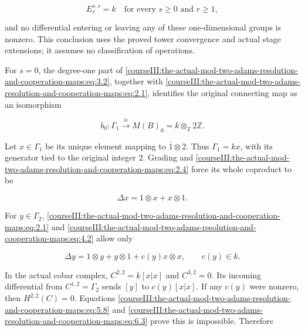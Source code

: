 \begin{equation}
E_r^{s,s}=k\quad\text{for every }s\geq0\text{ and }r\geq1,
 \label{courseIII:the-actual-mod-two-adams-resolution-and-cooperation-maps:eq:6.3}
\end{equation}

and no differential entering or leaving any of these one-dimensional groups is nonzero. This conclusion uses the proved tower convergence and actual stage extensions; it assumes no classification of operations.

For \(s=0\), the degree-one part of \eqref{courseIII:the-actual-mod-two-adams-resolution-and-cooperation-maps:eq:3.2}, together with \eqref{courseIII:the-actual-mod-two-adams-resolution-and-cooperation-maps:eq:2.1}, identifies the original connecting map as an isomorphism

\begin{equation}
b_0:\Gamma_1\xrightarrow{\ \cong\ }M(B)_0
    =k\otimes_{\mathbb Z}2\mathbb Z.
 \label{courseIII:the-actual-mod-two-adams-resolution-and-cooperation-maps:eq:6.4}
\end{equation}

Let \(x\in\Gamma_1\) be its unique element mapping to \(\bar1\otimes2\). Thus \(\Gamma_1=kx\), with its generator tied to the original integer \(2\). Grading and \eqref{courseIII:the-actual-mod-two-adams-resolution-and-cooperation-maps:eq:2.4} force its whole coproduct to be

\begin{equation}
\Delta x=1\otimes x+x\otimes1.
 \label{courseIII:the-actual-mod-two-adams-resolution-and-cooperation-maps:eq:6.5}
\end{equation}

For \(y\in\Gamma_2\), \eqref{courseIII:the-actual-mod-two-adams-resolution-and-cooperation-maps:eq:2.1} and \eqref{courseIII:the-actual-mod-two-adams-resolution-and-cooperation-maps:eq:4.2} allow only

\begin{equation}
\Delta y=1\otimes y+y\otimes1+c(y)x\otimes x,
 \qquad c(y)\in k.
 \label{courseIII:the-actual-mod-two-adams-resolution-and-cooperation-maps:eq:6.6}
\end{equation}

In the actual cobar complex, \(C^{2,2}=k[x|x]\) and \(C^{3,2}=0\). Its incoming differential from \(C^{1,2}=\Gamma_2\) sends \([y]\) to \(c(y)[x|x]\). If any \(c(y)\) were nonzero, then \(H^{2,2}(C)=0\). Equations \eqref{courseIII:the-actual-mod-two-adams-resolution-and-cooperation-maps:eq:5.8} and \eqref{courseIII:the-actual-mod-two-adams-resolution-and-cooperation-maps:eq:6.3} prove this is impossible. Therefore

